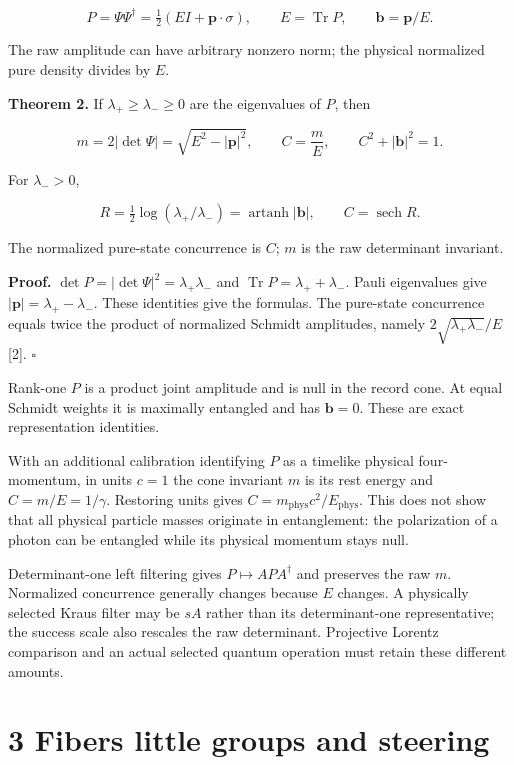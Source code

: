 \documentclass[
  11pt,
  a4paper,
]{article}
\begin{document}
\[P=\Psi\Psi^\dagger=\tfrac12(EI+\mathbf p\cdot\sigma),\qquad
E=\operatorname{Tr}P,\qquad \mathbf b=\mathbf p/E.\]

The raw amplitude can have arbitrary nonzero norm; the physical normalized pure density divides by \(E\).

\textbf{Theorem 2.} If \(\lambda_+\ge\lambda_-\ge0\) are the eigenvalues of \(P\), then

\[m=2|\det\Psi|=\sqrt{E^2-|\mathbf p|^2},\qquad
C=\frac mE,\qquad C^2+|\mathbf b|^2=1.\]

For \(\lambda_->0\),

\[R=\tfrac12\log(\lambda_+/\lambda_-)
=\operatorname{artanh}|\mathbf b|,\qquad C=\operatorname{sech}R.\]

The normalized pure-state concurrence is \(C\); \(m\) is the raw determinant invariant.

\textbf{Proof.} \(\det P=|\det\Psi|^2=\lambda_+\lambda_-\) and \(\operatorname{Tr}P=\lambda_++\lambda_-\). Pauli eigenvalues give \(|\mathbf p|=\lambda_+-\lambda_-\). These identities give the formulas. The pure-state concurrence equals twice the product of normalized Schmidt amplitudes, namely \(2\sqrt{\lambda_+\lambda_-}/E\) {[}2{]}. \(\square\)

Rank-one \(P\) is a product joint amplitude and is null in the record cone. At equal Schmidt weights it is maximally entangled and has \(\mathbf b=0\). These are exact representation identities.

With an additional calibration identifying \(P\) as a timelike physical four-momentum, in units \(c=1\) the cone invariant \(m\) is its rest energy and \(C=m/E=1/\gamma\). Restoring units gives \(C=m_{\mathrm{phys}}c^2/E_{\mathrm{phys}}\). This does not show that all physical particle masses originate in entanglement: the polarization of a photon can be entangled while its physical momentum stays null.

Determinant-one left filtering gives \(P\mapsto APA^\dagger\) and preserves the raw \(m\). Normalized concurrence generally changes because \(E\) changes. A physically selected Kraus filter may be \(sA\) rather than its determinant-one representative; the success scale also rescales the raw determinant. Projective Lorentz comparison and an actual selected quantum operation must retain these different amounts.

\section{3 Fibers little groups and steering}\label{fibers-little-groups-and-steering}
\end{document}
